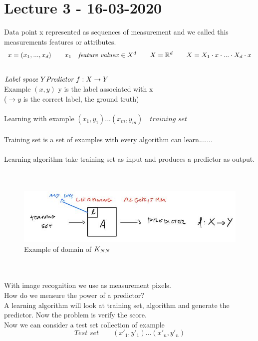 \documentclass[../main.tex]{subfiles}
\begin{document}
\chapter{Lecture 3 - 16-03-2020}
Data point x represented as sequences of measurement and we called this
measurements features or attributes.\\
$$ x = (x_1,..., x_d)  \qquad x_1 \quad \textit{feature value}
x \in X^d \qquad X = \mathbb{R}^d \qquad X = X_1 \cdot x \cdot ... \cdot X_d \cdot x
$$
\\
$
\textit{Label space } Y\\
\textit{Predictor } f : X \rightarrow Y \\
$
\\
Example $(x,y)$ \qquad y is the label associated with x\\
($ \rightarrow y$ is the correct label, the ground truth)\\
\\
Learning with example $(x_1,y_1)...(x_m,y_m)  \quad \textit{training set} $\\\\
Training set is a set of examples with every algorithm can learn.......\\\\
Learning algorithm take training set as input and produces a predictor as output.\\\\
\\
\begin{figure}[h]
    \centering
    \includegraphics[width=0.8\linewidth]{../img/lez3-img1.JPG}
    \caption{Example of domain of $K_{NN}$}
\end{figure}\\
\\With image recognition we use as measurement pixels.\\
How do we measure the power of a predictor?\\
A learning algorithm will look at training set, algorithm and generate the predictor. Now the problem is verify the score. \\
Now we can consider a test set collection of example
\\
$$ \textit{Test set} \qquad(x'_1, y'_1)...(x'_n,y'_n) $$
\end{document}
